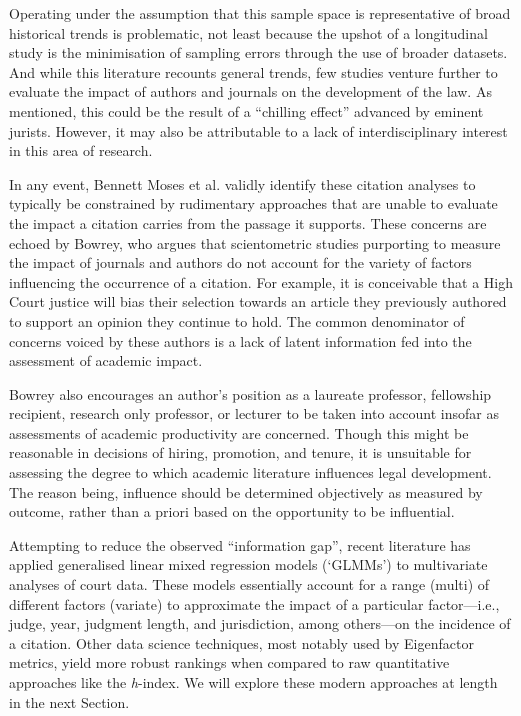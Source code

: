 Operating under the assumption that this sample space is representative of broad historical trends is problematic, not least because the upshot of a longitudinal study is the minimisation of sampling errors through the use of broader datasets. And while this literature recounts general trends, few studies venture further to evaluate the impact of authors and journals on the development of the law. As mentioned, this could be the result of a ``chilling effect'' advanced by eminent jurists. However, it may also be attributable to a lack of interdisciplinary interest in this area of research.

In any event, Bennett Moses et al. validly identify these citation analyses to typically be constrained by rudimentary approaches that are unable to evaluate the impact a citation carries from the passage it supports. These concerns are echoed by Bowrey, who argues that scientometric studies purporting to measure the impact of journals and authors do not account for the variety of factors influencing the occurrence of a citation. For example, it is conceivable that a High Court justice will bias their selection towards an article they previously authored to support an opinion they continue to hold. The common denominator of concerns voiced by these authors is a lack of latent information fed into the assessment of academic impact.

Bowrey also encourages an author's position as a laureate professor, fellowship recipient, research only professor, or lecturer to be taken into account insofar as assessments of academic productivity are concerned. Though this might be reasonable in decisions of hiring, promotion, and tenure, it is unsuitable for assessing the degree to which academic literature influences legal development. The reason being, influence should be determined objectively as measured by outcome, rather than a priori based on the opportunity to be influential.

Attempting to reduce the observed ``information gap'', recent literature has applied generalised linear mixed regression models (`GLMMs') to multivariate analyses of court data. These models essentially account for a range (multi) of different factors (variate) to approximate the impact of a particular factor---i.e., judge, year, judgment length, and jurisdiction, among others---on the incidence of a citation. Other data science techniques, most notably used by Eigenfactor metrics, yield more robust rankings when compared to raw quantitative approaches like the \textit{h}-index. We will explore these modern approaches at length in the next Section.
